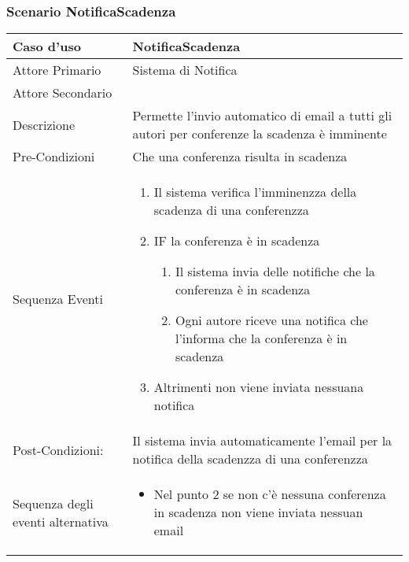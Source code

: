 \subsubsection{Scenario NotificaScadenza}
\begin{tabular}{|p{3cm}|p{7cm}|}
\hline 
\rowcolor{Orchid}
Caso d'uso & NotificaScadenza \\
\hline
Attore Primario & Sistema di Notifica\\
\hline
Attore Secondario & \\
\hline
Descrizione & Permette l'invio automatico di email a tutti gli autori per conferenze la scadenza è imminente\\
\hline
Pre-Condizioni& Che una conferenza risulta in scadenza\\
\hline
  Sequenza Eventi&
                   \begin{enumerate}
                   \item Il sistema verifica l'imminenzza della scadenza di una conferenzza
                   \item IF la conferenza è in scadenza
                    \begin{enumerate}
                    \item Il sistema invia delle notifiche che la conferenza è in scadenza
                    \item Ogni autore riceve una notifica che l'informa che la conferenza è in scadenza
                    \end{enumerate}
                   \item Altrimenti non viene inviata nessuana notifica
                   \end{enumerate}\\
\hline
Post-Condizioni: & Il sistema invia automaticamente l'email per la notifica della scadenzza di una conferenzza\\
\hline
Sequenza degli eventi alternativa & \begin{itemize}
  \item Nel punto 2 se non c'è nessuna conferenza in scadenza non viene inviata nessuan email
\end{itemize} \\
\hline
\end{tabular}

